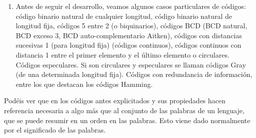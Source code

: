 \documentclass[
]{article}
\begin{document}
\begin{enumerate}
\begin{enumerate}
    mayúsculas, unido a la tilde y la diéresis cómo el conjunto de
    palabras del diccionario de la Real Academia de la Lengua,
    represen\-tando una palabra con una diéresis como cigüeña como
    ``cig\#ueña'', y si lleva una til\-de como en Julián como
    ``Juli\textasciitilde an''. Un nombre más habitual que el de
    lenguaje en electrónica suele ser el de código.
  \item
    Antes de seguir el desarrollo, veamos algunos casos particulares de
    códigos: código binario natural de cualquier longitud, código
    binario natural de longitud fija, códigos 5 entre 2 (o biquinarios),
    códigos BCD (BCD natural, BCD exceso 3, BCD auto-complementario
    Aitken), códigos con distancias sucesivas 1 (para longitud fija)
    (códigos continuos), códigos continuos con distancia 1 entre el
    primer elemento y el último elemento o circulares. Códigos
    especulares. Si son circulares y especulares se llaman códigos Gray
    (de una determinada longitud fija). Códigos con redundancia de
    infor\-mación, entre los que destacan los códigos Hamming.
  \end{enumerate}
\end{enumerate}

Podéis ver que en los códigos antes explicitados y sus propiedades hacen
referencia necesaria a algo más que al conjunto de las palabras de un
lenguaje, que se puede re\-sumir en un orden en las palabras. Esto viene
dado normalmente por el significado de las palabras.
\end{document}
